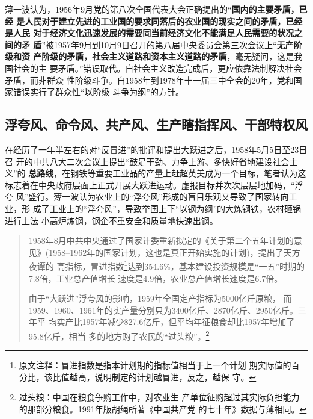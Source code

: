 薄一波认为，1956年9月党的第八次全国代表大会正确提出的“\textbf{国内的主要矛盾，已经
  是人民对于建立先进的工业国的要求同落后的农业国的现实之间的矛盾，已经是人民
  对于经济文化迅速发展的需要同当前经济文化不能满足人民需要的状况之间的矛
  盾}”被1957年9月到10月9日召开的第八届中央委员会第三次会议上“\textbf{无产阶级和资
  产阶级的矛盾，社会主义道路和资本主义道路的矛盾}，毫无疑问，这是我国社会的主
要矛盾。”错误取代。自社会主义改造完成后，更应依靠法制解决社会矛盾，而非群众
性阶级斗争。自1958年到1978年十一届三中全会的20年，党和国家错误实行了群众性“以阶级
斗争为纲”的方针。


\subsection{浮夸风、命令风、共产风、生产瞎指挥风、干部特权风}

在经历了一年半左右的对“反冒进”的批评和提出大跃进之后，1958年5月5日至23日召
开的中共八大二次会议上提出“鼓足干劲、力争上游、多快好省地建设社会主义”的
\textbf{总路线}，在钢铁等重要工业品的产量上赶超英美成为一个目标，笔者认为这
标志着在中央政府层面上正式开展大跃进运动。虚报目标并次次层层地加码，“浮夸
风”盛行。薄一波认为农业上的“浮夸风”形成的盲目乐观又导致了国家转向工业，形
成了工业上的“浮夸风”，导致举国上下“以钢为纲”的大炼钢铁，农村砸锅进行土法
小高炉炼钢，钢企不重安全和质量地快速出钢。

\begin{quotation}
  1958年8月中共中央通过了国家计委重新拟定的《关于第二个五年计划的意
  见》(1958--1962年的国家计划，这也是真正开始实施的计划)，提出了天方夜谭的
  高指标，冒进指数\footnote{原文注释：冒进指数是指本计划期的指标值相当于上一个计划
    期实际值的百分比，该比值越高，说明制定的计划越冒进，反之，越保
    守。}达到354.6\%，基本建设投资规模是“一五”时期的7.8倍，工业总产值增长
  速度是4.9倍，农业总产值增长速度是6.7倍。\cite{shiyiwu}

  由于“大跃进”浮夸风的影响，1959年全国定产指标为5000亿斤原粮，
  而1959、1960、1961年的实产量分别只为3400亿斤、2870亿斤、2950亿斤。三年平
  均实产比1957年减少827.6亿斤，但平均年征粮食却比1957年增加了95.8亿斤，相当
  多的地方购了农民的“过头粮”。\footnote{过头粮：中国在粮食争购工作中，对农业生
    产单位征购超过其实际负担能力的那部分粮食。1991年版胡绳所著《中国共产党
    的七十年》数据与薄相同。}
\end{quotation}


